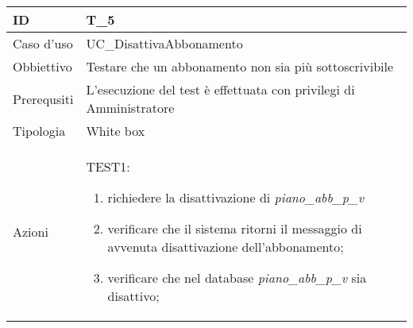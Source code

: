 \begin{table}[hb]
    \centering
    \begin{tabular}{ |p{2cm}|p{10cm}|  }
        \hline
        ID          & T\_5                                                               \\\hline
        Caso d'uso  & UC\_DisattivaAbbonamento                                           \\\hline
        Obbiettivo  & Testare che un abbonamento non sia più sottoscrivibile             \\\hline
        Prerequsiti & L'esecuzione del test è effettuata con privilegi di Amministratore \\\hline
        Tipologia   & White box                                                          \\\hline
        Azioni      &
        TEST1:
        \begin{enumerate}[nosep, topsep=0pt]
            \item richiedere la disattivazione di \emph{piano\_abb\_p\_v}
            \item verificare che il sistema ritorni il messaggio di avvenuta disattivazione dell'abbonamento;
            \item verificare che nel database \emph{piano\_abb\_p\_v} sia disattivo;
        \end{enumerate}
        \\\hline
    \end{tabular}
\end{table}

